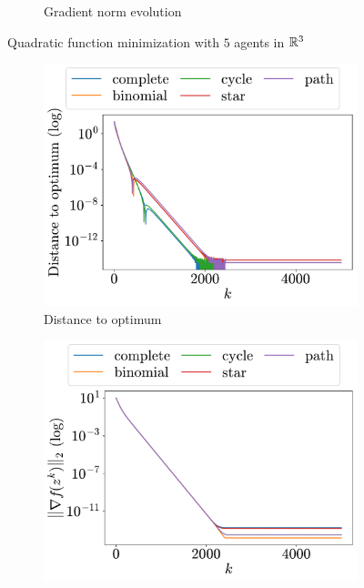 \documentclass[a4paper,11pt,oneside]{book}
\begin{document}
\begin{figure}[H]
\begin{subfigure}[t]{0.48\linewidth}
            \caption{Gradient norm evolution}
      \end{subfigure}
      \caption{Quadratic function minimization with $5$ agents in ${\mathbb{R}}^{3}$}
      \label{fig:quadratic_5_3}
\end{figure}

\begin{figure}[H]
      \centering
      \begin{subfigure}[t]{0.48\linewidth}
            \centering
            \includegraphics[width=\linewidth]{./figs/quadratic/5_15/distance.pdf} 
            \caption{Distance to optimum}
      \end{subfigure}
      \hfill
      \begin{subfigure}[t]{0.48\linewidth}
            \centering
            \includegraphics[width=\linewidth]{./figs/quadratic/5_15/gradient.pdf} 

\end{subfigure}
\end{figure}
\end{document}
